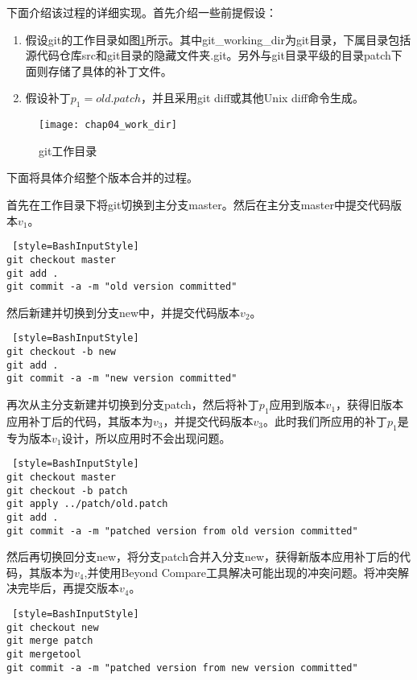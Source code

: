 下面介绍该过程的详细实现。首先介绍一些前提假设：

\begin{enumerate}
	\item 假设git的工作目录如图\ref {git_work_dir}所示。其中git\_working\_dir为git目录，下属目录包括源代码仓库src和git目录的隐藏文件夹.git。另外与git目录平级的目录patch下面则存储了具体的补丁文件。

	\item 假设补丁$p_1 = old.patch$，并且采用git diff或其他Unix diff命令生成。
\end{enumerate}

\begin{figure}[H]
	\centering
	\texttt{[image: chap04\_work\_dir]}
	\caption {git工作目录}
	\label {git_work_dir}	
\end{figure}

下面将具体介绍整个版本合并的过程。


首先在工作目录下将git切换到主分支master。然后在主分支master中提交代码版本$v_1$。

\begin{lstlisting} [style=BashInputStyle]
git checkout master
git add .
git commit -a -m "old version committed"
\end{lstlisting}

然后新建并切换到分支new中，并提交代码版本$v_2$。
\begin{lstlisting} [style=BashInputStyle]
git checkout -b new
git add .
git commit -a -m "new version committed"
\end{lstlisting}

再次从主分支新建并切换到分支patch，然后将补丁$p_1$应用到版本$v_1$，获得旧版本应用补丁后的代码，其版本为$v_3$，并提交代码版本$v_3$。此时我们所应用的补丁$p_1$是专为版本$v_1$设计，所以应用时不会出现问题。

\begin{lstlisting} [style=BashInputStyle]
git checkout master
git checkout -b patch
git apply ../patch/old.patch
git add .
git commit -a -m "patched version from old version committed"
\end{lstlisting}

然后再切换回分支new，将分支patch合并入分支new，获得新版本应用补丁后的代码，其版本为$v_4$,并使用Beyond Compare工具解决可能出现的冲突问题。将冲突解决完毕后，再提交版本$v_4$。

\begin{lstlisting} [style=BashInputStyle]
git checkout new
git merge patch
git mergetool
git commit -a -m "patched version from new version committed"
\end{lstlisting}


